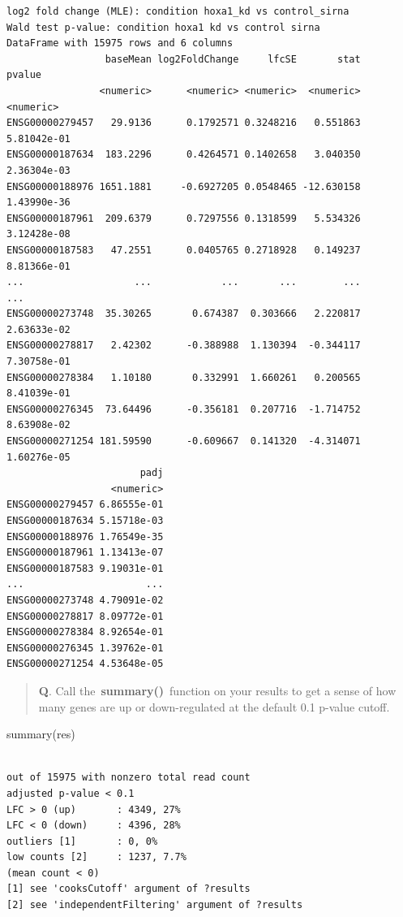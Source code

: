 \documentclass[
  letterpaper,
  DIV=11,
  numbers=noendperiod]{scrartcl}
\newenvironment{Shaded}{\begin{snugshade}}{\end{snugshade}}
\newcommand{\FunctionTok}[1]{\textcolor[rgb]{0.28,0.35,0.67}{#1}}
\newcommand{\NormalTok}[1]{\textcolor[rgb]{0.00,0.23,0.31}{#1}}
\begin{document}
\begin{verbatim}
log2 fold change (MLE): condition hoxa1_kd vs control_sirna 
Wald test p-value: condition hoxa1 kd vs control sirna 
DataFrame with 15975 rows and 6 columns
                 baseMean log2FoldChange     lfcSE       stat      pvalue
                <numeric>      <numeric> <numeric>  <numeric>   <numeric>
ENSG00000279457   29.9136      0.1792571 0.3248216   0.551863 5.81042e-01
ENSG00000187634  183.2296      0.4264571 0.1402658   3.040350 2.36304e-03
ENSG00000188976 1651.1881     -0.6927205 0.0548465 -12.630158 1.43990e-36
ENSG00000187961  209.6379      0.7297556 0.1318599   5.534326 3.12428e-08
ENSG00000187583   47.2551      0.0405765 0.2718928   0.149237 8.81366e-01
...                   ...            ...       ...        ...         ...
ENSG00000273748  35.30265       0.674387  0.303666   2.220817 2.63633e-02
ENSG00000278817   2.42302      -0.388988  1.130394  -0.344117 7.30758e-01
ENSG00000278384   1.10180       0.332991  1.660261   0.200565 8.41039e-01
ENSG00000276345  73.64496      -0.356181  0.207716  -1.714752 8.63908e-02
ENSG00000271254 181.59590      -0.609667  0.141320  -4.314071 1.60276e-05
                       padj
                  <numeric>
ENSG00000279457 6.86555e-01
ENSG00000187634 5.15718e-03
ENSG00000188976 1.76549e-35
ENSG00000187961 1.13413e-07
ENSG00000187583 9.19031e-01
...                     ...
ENSG00000273748 4.79091e-02
ENSG00000278817 8.09772e-01
ENSG00000278384 8.92654e-01
ENSG00000276345 1.39762e-01
ENSG00000271254 4.53648e-05
\end{verbatim}

\begin{quote}
\textbf{Q}. Call the~\textbf{summary()}~function on your results to get
a sense of how many genes are up or down-regulated at the default 0.1
p-value cutoff.
\end{quote}

\begin{Shaded}
\begin{Highlighting}[]
\FunctionTok{summary}\NormalTok{(res)}
\end{Highlighting}
\end{Shaded}

\begin{verbatim}

out of 15975 with nonzero total read count
adjusted p-value < 0.1
LFC > 0 (up)       : 4349, 27%
LFC < 0 (down)     : 4396, 28%
outliers [1]       : 0, 0%
low counts [2]     : 1237, 7.7%
(mean count < 0)
[1] see 'cooksCutoff' argument of ?results
[2] see 'independentFiltering' argument of ?results
\end{verbatim}
\end{document}

